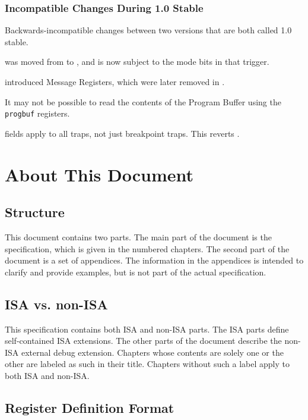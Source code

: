 \subsubsection{Incompatible Changes During 1.0 Stable}

\begin{steps}{Backwards-incompatible changes between two versions that are both
called 1.0 stable.}
\item \FcsrItriggerNmi was moved from \RcsrEtrigger to \RcsrItrigger, and is now
subject to the mode bits in that trigger.
\item {} introduced Message Registers, which were later removed in .
\item It may not be possible to read the contents of the Program Buffer using
the {\tt progbuf} registers. 
\item \RcsrTcontrol fields apply to all traps, not just breakpoint traps. This
    reverts . 
\end{steps}

\section{About This Document}

\subsection{Structure}

This document contains two parts. The main part of the document is the
specification, which is given in the numbered chapters. The second part
of the document is a set of appendices. The information
in the appendices is intended to clarify and provide examples, but is
not part of the actual specification.

\subsection{ISA vs. non-ISA}

This specification contains both ISA and non-ISA parts. The ISA parts define
self-contained ISA extensions. The other parts of the document describe the
non-ISA external debug extension.
Chapters whose contents are solely one or the other are labeled as such in their
title. Chapters without such a label apply to both ISA and non-ISA.

\subsection{Register Definition Format}

